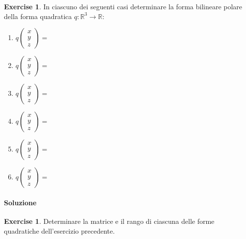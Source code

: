 \documentclass{article}
\theoremstyle{plain}
\theoremstyle{definition}
\newtheorem{xca}[exmp]{Exercise}
\theoremstyle{remark}
\begin{document}
\begin{bxthm}
\begin{xca}
    In ciascuno dei seguenti casi determinare la forma bilineare polare della forma quadratica $q:\mathbb{R}^3\to\mathbb{R}$:
    \begin{enumerate}
        \item $q\begin{pmatrix}x\\y\\z\end{pmatrix}=$
        \item $q\begin{pmatrix}x\\y\\z\end{pmatrix}=$
        \item $q\begin{pmatrix}x\\y\\z\end{pmatrix}=$
        \item $q\begin{pmatrix}x\\y\\z\end{pmatrix}=$
        \item $q\begin{pmatrix}x\\y\\z\end{pmatrix}=$
        \item $q\begin{pmatrix}x\\y\\z\end{pmatrix}=$
    \end{enumerate}
\end{xca}
\end{bxthm}
\paragraph{Soluzione}

\vspace{10pt}

\begin{bxthm}
\begin{xca}
    Determinare la matrice e il rango di ciascuna delle forme quadratiche dell'esercizio precedente.
\end{xca}
\end{bxthm}
\end{document}
